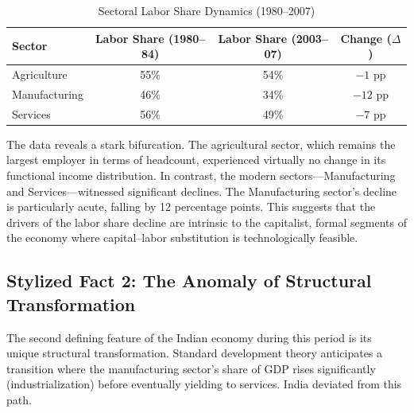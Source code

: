 \documentclass[12pt]{article}
\begin{document}
\begin{table}[H]
\centering
\caption{Sectoral Labor Share Dynamics (1980--2007)}
\begin{tabular}{lccc}
\toprule
Sector & Labor Share (1980--84) & Labor Share (2003--07) & Change ($\Delta$) \\
\midrule
Agriculture & 55\% & 54\% & $-1$ pp \\
Manufacturing & 46\% & 34\% & $-12$ pp \\
Services & 56\% & 49\% & $-7$ pp \\
\bottomrule
\end{tabular}
\end{table}

The data reveals a stark bifurcation. The agricultural sector, which remains the largest employer in terms of headcount, experienced virtually no change in its functional income distribution. In contrast, the modern sectors—Manufacturing and Services—witnessed significant declines. The Manufacturing sector’s decline is particularly acute, falling by 12 percentage points. This suggests that the drivers of the labor share decline are intrinsic to the capitalist, formal segments of the economy where capital–labor substitution is technologically feasible.

\subsection{Stylized Fact 2: The Anomaly of Structural Transformation}
The second defining feature of the Indian economy during this period is its unique structural transformation. Standard development theory anticipates a transition where the manufacturing sector's share of GDP rises significantly (industrialization) before eventually yielding to services. India deviated from this path.
\end{document}
